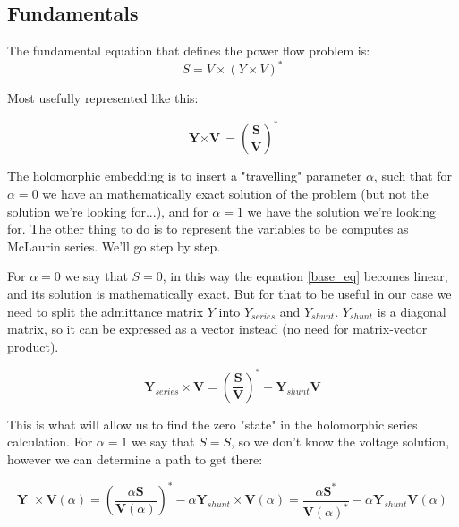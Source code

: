 \documentclass[11pt,fleqn]{book} %
\begin{document}
\subsection{Fundamentals}

The fundamental equation that defines the power flow problem is:
\begin{equation}
S = V \times (Y \times V)^*
\end{equation}

Most usefully represented like this:


\begin{equation}
{\textbf{Y} \times \textbf{V}} = \left(\frac{\textbf{S}}{\textbf{V}}\right)^* 
\label{base_eq}
\end{equation}


The holomorphic embedding is to insert a "travelling" parameter $\alpha$, such that for $\alpha=0$ we have an mathematically exact solution of the problem (but not the solution we're looking for...), and for $\alpha=1$ we have the solution we're looking for. The other thing to do is to represent the variables to be computes as McLaurin series. We'll go step by step.\newline

For $\alpha=0$ we say that $S=0$, in this way the equation \ref{base_eq} becomes linear, and its solution is mathematically exact. But for that to be useful in our case we need to split the admittance matrix $Y$ into $Y_{series}$ and $Y_{shunt}$. $Y_{shunt}$ is a diagonal matrix, so it can be expressed as a vector instead (no need for matrix-vector product).

\begin{equation}
\textbf{Y}_{series} \times \textbf{V} = \left(\frac{\textbf{S}}{\textbf{V}}\right)^* - \textbf{Y}_{shunt} \textbf{V}
\label{base_eq_alpha_0}
\end{equation}

This is what will allow us to find the zero "state" in the holomorphic series calculation. For $\alpha=1$ we say that $S=S$, so we don't know the voltage solution, however we can determine a path to get there:

\begin{equation}
{\textbf{Y }\times \textbf{V}( \alpha )} = \left(\frac{ \alpha\textbf{S}}{\textbf{V}( \alpha )}\right)^* - \alpha \textbf{Y}_{shunt} \times \textbf{V}( \alpha ) = \frac{ \alpha\textbf{S}^*}{\textbf{V}( \alpha )^*} - \alpha \textbf{Y}_{shunt} \textbf{V}( \alpha )
\label{base_eq_embedded}
\end{equation}
\end{document}
